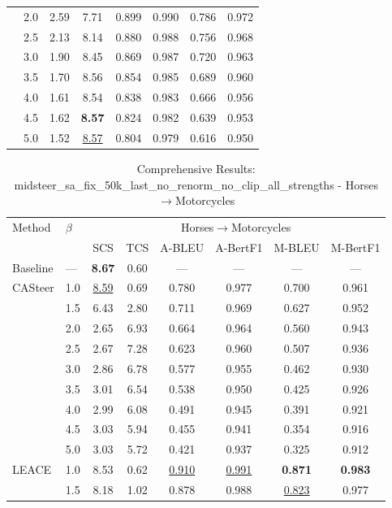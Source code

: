 \begin{table}[htbp]
\begin{tabular}{l|l|cccccc|}
 & 2.0 & 2.59 & 7.71 & 0.899 & 0.990 & 0.786 & 0.972 \\
 & 2.5 & 2.13 & 8.14 & 0.880 & 0.988 & 0.756 & 0.968 \\
 & 3.0 & 1.90 & 8.45 & 0.869 & 0.987 & 0.720 & 0.963 \\
 & 3.5 & 1.70 & 8.56 & 0.854 & 0.985 & 0.689 & 0.960 \\
 & 4.0 & 1.61 & 8.54 & 0.838 & 0.983 & 0.666 & 0.956 \\
 & 4.5 & 1.62 & \textbf{8.57} & 0.824 & 0.982 & 0.639 & 0.953 \\
 & 5.0 & 1.52 & \underline{8.57} & 0.804 & 0.979 & 0.616 & 0.950 \\
\hline
\end{tabular}
\end{table}

\begin{table}[htbp]
\centering
\caption{Comprehensive Results: midsteer\_sa\_fix\_50k\_last\_no\_renorm\_no\_clip\_all\_strengths - Horses$\to$Motorcycles}
\label{tab:single_experiment_table_without_clipping_horses_to_motorcycles}
\begin{tabular}{l|l|cccccc|}
\hline
Method & $\beta$ & \multicolumn{6}{c|}{Horses$\rightarrow$Motorcycles} \\
 &  & SCS & TCS & A-BLEU & A-BertF1 & M-BLEU & M-BertF1 \\
\hline
Baseline & — & \textbf{8.67} & 0.60 & — & — & — & — \\
\hline
CASteer & 1.0 & \underline{8.59} & 0.69 & 0.780 & 0.977 & 0.700 & 0.961 \\
 & 1.5 & 6.43 & 2.80 & 0.711 & 0.969 & 0.627 & 0.952 \\
 & 2.0 & 2.65 & 6.93 & 0.664 & 0.964 & 0.560 & 0.943 \\
 & 2.5 & 2.67 & 7.28 & 0.623 & 0.960 & 0.507 & 0.936 \\
 & 3.0 & 2.86 & 6.78 & 0.577 & 0.955 & 0.462 & 0.930 \\
 & 3.5 & 3.01 & 6.54 & 0.538 & 0.950 & 0.425 & 0.926 \\
 & 4.0 & 2.99 & 6.08 & 0.491 & 0.945 & 0.391 & 0.921 \\
 & 4.5 & 3.03 & 5.94 & 0.455 & 0.941 & 0.354 & 0.916 \\
 & 5.0 & 3.03 & 5.72 & 0.421 & 0.937 & 0.325 & 0.912 \\
\hline
LEACE & 1.0 & 8.53 & 0.62 & \underline{0.910} & \underline{0.991} & \textbf{0.871} & \textbf{0.983} \\
 & 1.5 & 8.18 & 1.02 & 0.878 & 0.988 & \underline{0.823} & 0.977 \\

\end{tabular}
\end{table}
